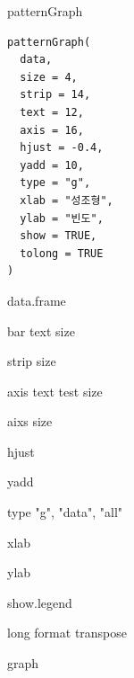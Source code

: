 \documentclass[a4paper]{book}
\begin{document}
%
\begin{Description}
patternGraph
\end{Description}
%
\begin{Usage}
\begin{verbatim}
patternGraph(
  data,
  size = 4,
  strip = 14,
  text = 12,
  axis = 16,
  hjust = -0.4,
  yadd = 10,
  type = "g",
  xlab = "성조형",
  ylab = "빈도",
  show = TRUE,
  tolong = TRUE
)
\end{verbatim}
\end{Usage}
%
\begin{Arguments}
\begin{ldescription}
\item[\code{data}] data.frame

\item[\code{size}] bar text size

\item[\code{strip}] strip size

\item[\code{text}] axis text test size

\item[\code{axis}] aixs size

\item[\code{hjust}] hjust

\item[\code{yadd}] yadd

\item[\code{type}] type "g", "data", "all"

\item[\code{xlab}] xlab

\item[\code{ylab}] ylab

\item[\code{show}] show.legend

\item[\code{tolong}] long format transpose
\end{ldescription}
\end{Arguments}
%
\begin{Value}
graph
\end{Value}
%
\end{document}
